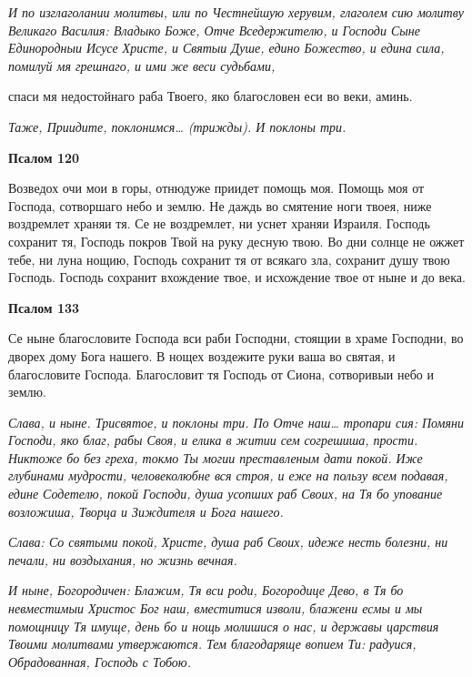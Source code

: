  \itshape И по изглаголании молитвы, или по Честнейшую херувим, глаголем сию
молитву Великаго Василия:\normalfont{} Владыко Боже, Отче Вседержителю, и
Господи Сыне Единородныи Исусе Христе, и Святыи Душе, едино
Божество, и едина сила, помилуй мя грешнаго, и ими же веси судьбами,

спаси мя недостойнаго раба Твоего, яко благословен еси во веки,
аминь.


 \itshape Таже,\normalfont{} Приидите, поклонимся… \itshape (трижды)\normalfont{}. \itshape И поклоны три. \normalfont{}






 

\bfseries Псалом 120\normalfont{}


   Возведох очи мои в горы, отнюдуже приидет помощь моя. Помощь моя от
Господа, сотворшаго небо и землю. Не даждь во смятение ноги твоея, ниже
воздремлет храняи тя. Се не воздремлет, ни уснет храняи Израиля. Господь
сохранит тя, Господь покров Твой на руку десную твою. Во дни солнце не
ожжет тебе, ни луна нощию, Господь сохранит тя от всякаго зла, сохранит
душу твою Господь. Господь сохранит вхождение твое, и исхождение твое от
ныне и до века.






 

\bfseries Псалом 133\normalfont{}


   Се ныне благословите Господа вси раби Господни, стоящии в храме
Господни, во дворех дому Бога нашего. В нощех воздежите руки ваша во
святая, и благословите Господа. Благословит тя Господь от Сиона,
сотворивыи небо и землю.


 \itshape Слава, и ныне\normalfont{}. \itshape Трисвятое\normalfont{}, \itshape и поклоны три. По\normalfont{} Отче наш… \itshape тропари сия:\normalfont{}
Помяни Господи, яко благ, рабы Своя, и елика в житии сем согрешиша,
прости. Никтоже бо без греха, токмо Ты могии преставленым дати покой.
Иже глубинами мудрости, человеколюбне вся строя, и еже на пользу
всем подавая, едине Содетелю, покой Господи, душа усопших раб
Своих, на Тя бо упование возложиша, Творца и Зиждителя и Бога
нашего.


 \itshape Слава:\normalfont{} Со святыми покой, Христе, душа раб Своих, идеже несть болезни,
ни печали, ни воздыхания, но жизнь вечная.


 \itshape И ныне, Богородичен:\normalfont{} Блажим, Тя вси роди, Богородице Дево, в Тя бо
невместимыи Христос Бог наш, вместитися изволи, блажени есмы и мы
помощницу Тя имуще, день бо и нощь молишися о нас, и державы царствия
Твоими молитвами утвержаются. Тем благодаряще вопием Ти: радуися,
Обрадованная, Господь с Тобою.


